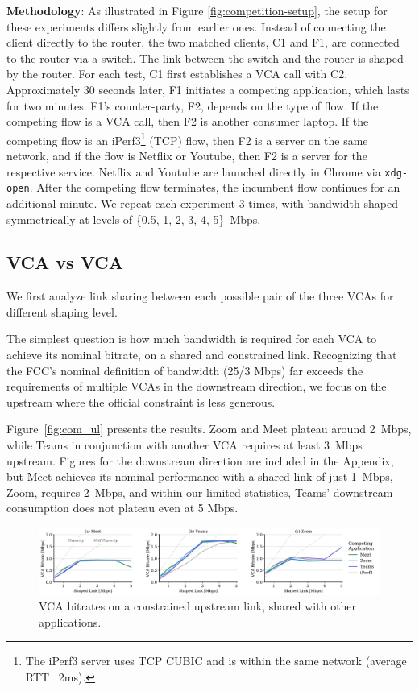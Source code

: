 \noindent \textbf{Methodology}: As illustrated in Figure \ref{fig:competition-setup}, the setup for these experiments differs slightly from earlier ones. 
Instead of connecting the client directly to the router, the two matched clients, C1 and F1, are connected to the router via a switch. 
The link between the switch and the router is shaped by the router. For each test, C1 first establishes a VCA call with C2.
Approximately 30 seconds later, F1 initiates a competing application, which lasts for two minutes.
F1's counter-party, F2, depends on the type of flow.
If the competing flow is a VCA call, then F2 is another consumer laptop.
If the competing flow is an iPerf3\footnote{The iPerf3 server uses TCP CUBIC and is  within the same network (average RTT ~2ms).} (TCP) flow, then F2 is a server on the same network,
  and if the flow is Netflix or Youtube, then F2 is a server for the respective service. Netflix and Youtube are launched directly in Chrome via \texttt{xdg-open}.
After the competing flow terminates, the incumbent flow continues for an additional minute.
We repeat each experiment 3 times, with bandwidth shaped symmetrically at levels of \{0.5, 1, 2, 3, 4, 5\}~Mbps.

\subsection{VCA vs VCA}



We first analyze link sharing between each possible pair of the three VCAs for different shaping level.  

The simplest question is how much bandwidth is required for each VCA to achieve its nominal bitrate, on a shared and constrained link.  Recognizing that the FCC's nominal definition of bandwidth (25/3 Mbps) far exceeds the requirements of multiple VCAs in the downstream direction, we focus on the upstream where the official constraint is less generous.  

Figure~\ref{fig:com_ul} presents the results.  Zoom and Meet plateau around 2~Mbps, while Teams in conjunction with another VCA requires at least 3~Mbps upstream.  Figures for the downstream direction are included in the Appendix, but Meet achieves its nominal performance with a shared link of just 1~Mbps, Zoom, requires 2~Mbps, and within our limited statistics, Teams' downstream consumption does not plateau even at 5 Mbps.

\begin{figure}
    \centering
    \includegraphics[width=\linewidth]{figures/comp/ul_competition_all.pdf}
    \caption{VCA bitrates on a constrained upstream link, shared with other applications.}
    \label{fig:comp_ul}
\end{figure}


